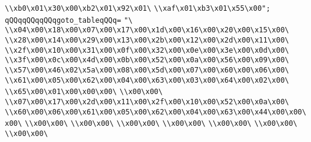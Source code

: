\verb|\\xb0\x01\x30\x00\xb2\x01\x92\x01\|\newline
\verb|\\xaf\x01\xb3\x01\x55\x00";|\newline
\verb|qQQqqQQqqQQqgoto_tableqQQq=|\newline
\verb|"\|\newline
\verb|\\x04\x00\x18\x00\x07\x00\x17\x00\x1d\x00\x16\x00\x20\x00\x15\x00\|\newline
\verb|\\x28\x00\x14\x00\x29\x00\x13\x00\x2b\x00\x12\x00\x2d\x00\x11\x00\|\newline
\verb|\\x2f\x00\x10\x00\x31\x00\x0f\x00\x32\x00\x0e\x00\x3e\x00\x0d\x00\|\newline
\verb|\\x3f\x00\x0c\x00\x4d\x00\x0b\x00\x52\x00\x0a\x00\x56\x00\x09\x00\|\newline
\verb|\\x57\x00\x46\x02\x5a\x00\x08\x00\x5d\x00\x07\x00\x60\x00\x06\x00\|\newline
\verb|\\x61\x00\x05\x00\x62\x00\x04\x00\x63\x00\x03\x00\x64\x00\x02\x00\|\newline
\verb|\\x65\x00\x01\x00\x00\x00\|\newline
\verb|\\x00\x00\|\newline
\verb|\\x07\x00\x17\x00\x2d\x00\x11\x00\x2f\x00\x10\x00\x52\x00\x0a\x00\|\newline
\verb|\\x60\x00\x06\x00\x61\x00\x05\x00\x62\x00\x04\x00\x63\x00\x44\x00\x00\x00\|\newline
\verb|\\x00\x00\|\newline
\verb|\\x00\x00\|\newline
\verb|\\x00\x00\|\newline
\verb|\\x00\x00\|\newline
\verb|\\x00\x00\|\newline
\verb|\\x00\x00\|\newline
\verb|\\x00\x00\|\newline
